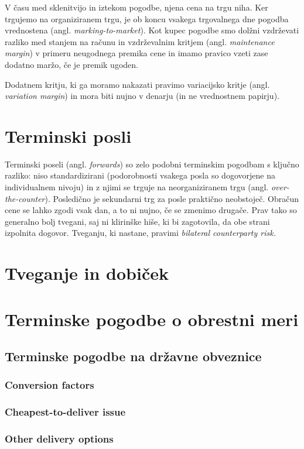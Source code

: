 \documentclass[a4paper, 12pt]{article}
\begin{document}
V času med sklenitvijo in iztekom pogodbe, njena cena na trgu niha. Ker trgujemo na organiziranem
trgu, je ob koncu vsakega trgovalnega dne pogodba vrednostena (angl. \textit{marking-to-market}). 
Kot kupec pogodbe smo dolžni vzdrževati razliko med stanjem na računu in vzdrževalnim kritjem
(angl. \textit{maintenance margin}) v primeru neugodnega premika cene in imamo pravico vzeti zase 
dodatno maržo, če je premik ugoden. 

Dodatnem kritju, ki ga moramo nakazati pravimo variacijsko kritje (angl. \textit{variation margin}) 
in mora biti nujno v denarju (in ne vrednostnem papirju).

\section{Terminski posli}
Terminski poseli (angl. \textit{forwards}) so zelo podobni terminskim pogodbam s ključno razliko:
niso standardizirani (podorobnosti vsakega posla so dogovorjene na individualnem nivoju) in z njimi
se trguje na neorganiziranem trgu (angl. \textit{over-the-counter}). Posledično je sekundarni trg za 
posle praktično neobstoječ. Obračun cene se lahko zgodi vsak dan, a to ni nujno, če se zmenimo drugače.
Prav tako so generalno bolj tvegani, saj ni klirinške hiše, ki bi zagotovila, da obe strani izpolnita
dogovor. Tveganju, ki nastane, pravimi \textit{bilateral counterparty risk.}

\section{Tveganje in dobiček}

\section{Terminske pogodbe o obrestni meri}
\subsection{Terminske pogodbe na državne obveznice}
\subsubsection{Conversion factors}
\subsubsection{Cheapest-to-deliver issue}
\subsubsection{Other delivery options}
\end{document}
